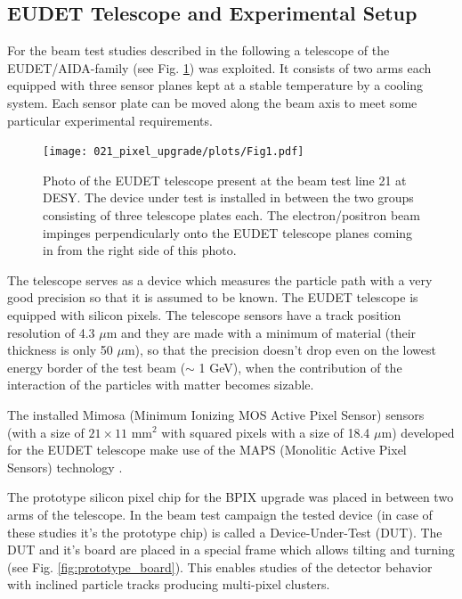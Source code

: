 \subsection{EUDET Telescope and Experimental Setup} 

For the beam test studies described in the following a telescope of the EUDET/AIDA-family \cite{EUDET} (see Fig. \ref{fig:EUDET_tel}) 
was exploited. It consists of two arms each equipped with three sensor planes kept at a stable temperature by a cooling
system. Each sensor plate can be moved along the beam axis to meet some particular experimental requirements.

\begin{figure}[t]
 \centering
 \texttt{[image: 021\_pixel\_upgrade/plots/Fig1.pdf]}
 \caption{Photo of the EUDET telescope present at the beam test line 21 at DESY. The device under test is installed in between the two
 groups consisting of three telescope plates each. The electron/positron beam impinges perpendicularly onto the EUDET telescope planes 
 coming in from the right side of this photo.}
 \label{fig:EUDET_tel}
\end{figure}

The telescope serves as a device which measures the particle path with a very good precision so that it is assumed to be known.
The EUDET telescope is equipped with silicon pixels. The telescope sensors have a track position resolution of 4.3 $\mu$m and they
are made with a minimum of material (their thickness is only 50 $\mu$m), so that the precision doesn't drop even on the lowest 
energy border of the test beam ($\sim$ 1 GeV), when the contribution of the interaction of the particles with matter becomes sizable. 

The installed Mimosa (Minimum Ionizing MOS Active Pixel Sensor) sensors (with a size of 
$21 \times 11$ mm$^{2}$ with squared pixels with a size of 18.4 $\mu$m) developed for the EUDET telescope make use of the MAPS 
(Monolitic Active Pixel Sensors) technology \cite{2001NIMPA.458..677T, Fischer:2002bv}.

The prototype silicon pixel chip for the BPIX upgrade was placed in between two arms of the telescope. In the beam test 
campaign the tested device (in case of these studies it's the prototype chip) is called a Device-Under-Test (DUT). The DUT
and it's board are placed in a special frame which allows tilting and turning (see Fig. \ref{fig:prototype_board}). 
This enables studies of the detector behavior with inclined particle tracks producing multi-pixel clusters. 

